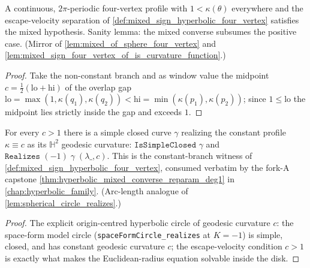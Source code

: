 \begin{lemma}
  \label{lem:mixed_hyperbolic_of_escape_positive}
  A continuous, $2\pi$-periodic four-vertex profile with $1<\kappa(\theta)$
  everywhere and the escape-velocity separation of
  \cref{def:mixed_sign_hyperbolic_four_vertex} satisfies the mixed hypothesis.
  Sanity lemma: the mixed converse subsumes the positive case. (Mirror of
  \cref{lem:mixed_of_sphere_four_vertex} and
  \cref{lem:mixed_sign_four_vertex_of_is_curvature_function}.)
\end{lemma}

\begin{proof}\leanok
  Take the non-constant branch and as window value the midpoint
  $c=\tfrac12(\mathrm{lo}+\mathrm{hi})$ of the overlap gap
  $\mathrm{lo}=\max(1,\kappa(q_1),\kappa(q_2))<
  \mathrm{hi}=\min(\kappa(p_1),\kappa(p_2))$; since $1\le\mathrm{lo}$ the
  midpoint lies strictly inside the gap and exceeds $1$.
\end{proof}

\begin{theorem}
  \label{thm:hyperbolic_circle_realizes}
  For every $c>1$ there is a simple closed curve $\gamma$ realizing the constant
  profile $\kappa\equiv c$ as its $\mathbb H^2$ geodesic curvature:
  $\texttt{IsSimpleClosed }\gamma$ and $\texttt{Realizes }(-1)\;\gamma\;(\lambda\_,c)$.
  This is the constant-branch witness of
  \cref{def:mixed_sign_hyperbolic_four_vertex}, consumed verbatim by the
  fork-A capstone \cref{thm:hyperbolic_mixed_converse_reparam_deg1} in
  \cref{chap:hyperbolic_family}. (Arc-length analogue of
  \cref{lem:spherical_circle_realizes}.)
\end{theorem}

\begin{proof}\leanok
  The explicit origin-centred hyperbolic circle of geodesic curvature $c$: the
  space-form model circle (\texttt{spaceFormCircle\_realizes} at
  $K=-1$) is simple, closed, and has constant geodesic curvature
  $c$; the escape-velocity condition $c>1$ is exactly what makes the
  Euclidean-radius equation solvable inside the disk.
\end{proof}
